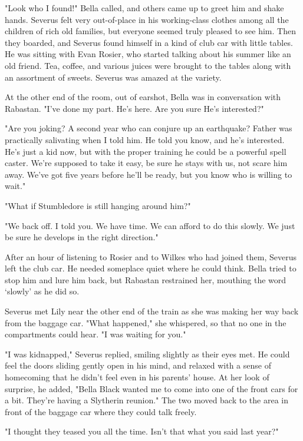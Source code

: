 "Look who I found!" Bella called, and others came up to greet him and shake hands. Severus felt very out-of-place in his working-class clothes among all the children of rich old families, but everyone seemed truly pleased to see him. Then they boarded, and Severus found himself in a kind of club car with little tables. He was sitting with Evan Rosier, who started talking about his summer like an old friend. Tea, coffee, and various juices were brought to the tables along with an assortment of sweets. Severus was amazed at the variety.

At the other end of the room, out of earshot, Bella was in conversation with Rabastan. "I've done my part. He's here. Are you sure He's interested?"

"Are you joking? A second year who can conjure up an earthquake? Father was practically salivating when I told him. He told{\el} you know, and he's interested. He's just a kid now, but with the proper training he could be a powerful spell caster. We're supposed to take it easy, be sure he stays with us, not scare him away. We've got five years before he'll be ready, but{\el} you know who is willing to wait."

"What if Stumbledore is still hanging around him?"

"We back off. I told you. We have time. We can afford to do this slowly. We just be sure he develops in the right direction."

After an hour of listening to Rosier and to Wilkes who had joined them, Severus left the club car. He needed someplace quiet where he could think. Bella tried to stop him and lure him back, but Rabastan restrained her, mouthing the word `slowly' as he did so.

Severus met Lily near the other end of the train as she was making her way back from the baggage car. "What happened," she whispered, so that no one in the compartments could hear. "I was waiting for you."

"I was kidnapped," Severus replied, smiling slightly as their eyes met. He could feel the doors sliding gently open in his mind, and relaxed with a sense of homecoming that he didn't feel even in his parents' house. At her look of surprise, he added, "Bella Black wanted me to come into one of the front cars for a bit. They're having a Slytherin reunion." The two moved back to the area in front of the baggage car where they could talk freely.

"I thought they teased you all the time. Isn't that what you said last year?"

